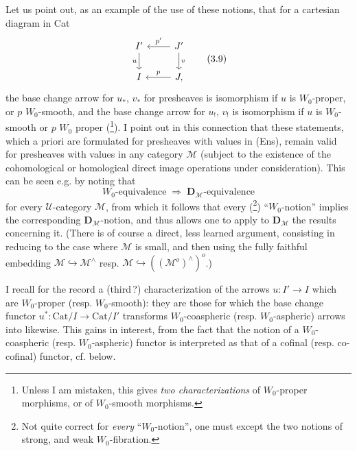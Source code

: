 \documentclass[11pt]{article}
\newcommand{\msp}[1]{\marginpar{\footnotesize [#1]}}
\newcommand{\Cat}{\mathrm{Cat}}
\begin{document}
Let us point out, as an example of the use of these notions, that for a cartesian diagram in Cat
\[
\begin{tikzcd}
I' \arrow[d, "u"'] & J' \arrow[l, "p'"'] \arrow[d, "v"] \\
I & J, \arrow[l, "p"']
\end{tikzcd} \tag*{(3.9)}
\]
the base change arrow for $u_*$, $v_*$ for presheaves is isomorphism if $u$ is $W_0$-proper, or $p$ $W_0$-smooth, and the base change arrow for $u_!$, $v_!$ is isomorphism if $u$ is $W_0$-smooth or $p$ $W_0$ proper (\footnote[51]{Unless I am mistaken, this gives \textit{two characterizations} of $W_0$-proper morphisms, or of $W_0$-smooth morphisms.}). I point out in this connection that these statements, which a priori are formulated for presheaves with values in (Ens), remain valid %
\msp{page 40}
for presheaves with values in any category $\mathcal{M}$ (subject to the existence of the cohomological or homological direct image operations under consideration). This can be seen e.g. by noting that %
\[
\text{$W_0$-equivalence} \;\Longrightarrow\; \text{$\mathbf{D}_{\mathcal{M}}$-equivalence} \tag*{(3.10)}
\]
for every $\mathcal{U}$-category $\mathcal{M}$, from which it follows that every (\footnote[52]{Not quite correct for \textit{every} ``$W_0$-notion'', one must except the two notions of strong, and weak $W_0$-fibration.}) ``$W_0$-notion'' implies the corresponding $\mathbf{D}_{\mathcal{M}}$-notion, and thus allows one to apply to $\mathbf{D}_{\mathcal{M}}$ the results concerning it. (There is of course a direct, less learned argument, consisting in reducing to the case where $\mathcal{M}$ is small, and then using the fully faithful embedding $\mathcal{M} \hookrightarrow \mathcal{M}^{\wedge}$ resp. $\mathcal{M} \hookrightarrow ((\mathcal{M}^o)^{\wedge})^o$.)

I recall for the record a (third\,?) characterization of the arrows $u : I' \longrightarrow I$ which are $W_0$-proper (resp. $W_0$-smooth): they are those for which the base change functor $u^* : \Cat/I \longrightarrow \Cat/I'$ transforms $W_0$-coaspheric (resp. $W_0$-aspheric) arrows into likewise. This gains in interest, from the fact that the notion of a $W_0$-coaspheric (resp. $W_0$-aspheric) functor is interpreted as that of a cofinal (resp. co-cofinal) functor, cf. below.
\end{document}
